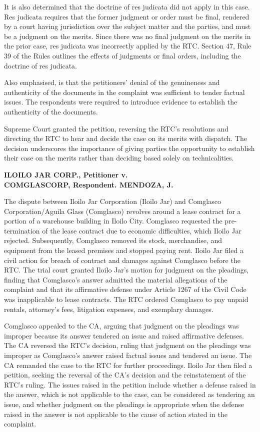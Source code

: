 \documentclass[
12pt,
oneside,
onehalfspacing,
headsepline
]{DigestCollection}
\begin{document}
It is also determined that the doctrine of res judicata did not apply in this case. Res judicata requires that the former judgment or order must be final, rendered by a court having jurisdiction over the subject matter and the parties, and must be a judgment on the merits. Since there was no final judgment on the merits in the prior case, res judicata was incorrectly applied by the RTC. Section 47, Rule 39 of the Rules outlines the effects of judgments or final orders, including the doctrine of res judicata.

Also emphasised, is that the petitioners' denial of the genuineness and authenticity of the documents in the complaint was sufficient to tender factual issues. The respondents were required to introduce evidence to establish the authenticity of the documents.

Supreme Court granted the petition, reversing the RTC's resolutions and directing the RTC to hear and decide the case on its merits with dispatch. The decision underscores the importance of giving parties the opportunity to establish their case on the merits rather than deciding based solely on technicalities.

\label{4bd3add0-0a2b-11ef-a1a5-03b0bde1fccf}


\noindent\textbf{ILOILO JAR CORP., Petitioner v.\\ COMGLASCORP, Respondent. MENDOZA, J.}\vspace{0.4cm}

The dispute between Iloilo Jar Corporation (Iloilo Jar) and Comglasco Corporation/Aguila Glass (Comglasco) revolves around a lease contract for a portion of a warehouse building in Iloilo City. Comglasco requested the pre-termination of the lease contract due to economic difficulties, which Iloilo Jar rejected. Subsequently, Comglasco removed its stock, merchandise, and equipment from the leased premises and stopped paying rent. Iloilo Jar filed a civil action for breach of contract and damages against Comglasco before the RTC. The trial court granted Iloilo Jar's motion for judgment on the pleadings, finding that Comglasco's answer admitted the material allegations of the complaint and that its affirmative defense under Article 1267 of the Civil Code was inapplicable to lease contracts. The RTC ordered Comglasco to pay unpaid rentals, attorney's fees, litigation expenses, and exemplary damages. 

Comglasco appealed to the CA, arguing that judgment on the pleadings was improper because its answer tendered an issue and raised affirmative defenses. The CA reversed the RTC's decision, ruling that judgment on the pleadings was improper as Comglasco's answer raised factual issues and tendered an issue. The CA remanded the case to the RTC for further proceedings. Iloilo Jar then filed a petition, seeking the reversal of the CA's decision and the reinstatement of the RTC's ruling. The issues raised in the petition include whether a defense raised in the answer, which is not applicable to the case, can be considered as tendering an issue, and whether judgment on the pleadings is appropriate when the defense raised in the answer is not applicable to the cause of action stated in the complaint.
\end{document}
